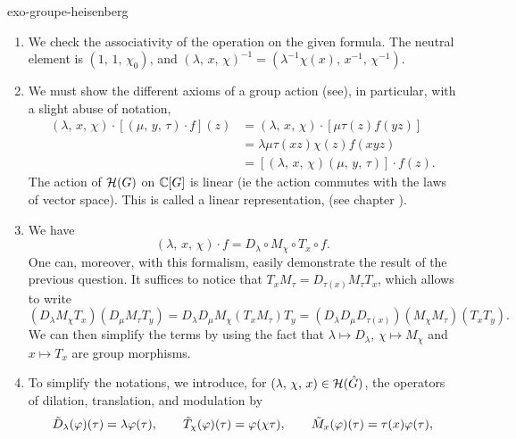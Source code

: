  
\begin{correction}{exo-groupe-heisenberg}
 \begin{enumerate}
\item We check the associativity of the operation on the given formula. The neutral element is $ (1, \, 1, \, \chi_0) $, and $ (\lambda, \, x, \, \chi)^{-1} = (\lambda^{-1} \chi (x), \, x^{-1}, \, \chi^{-1}) $.
\item We must show the different axioms of a group action (see{\upshape \cite{perrin}}), in particular, with a slight abuse of notation,
\begin{align*}
(\lambda, \, x, \, \chi) \cdot \left[(\mu, \, y, \, \tau) \cdot f \right] (z) & = (\lambda, \, x, \, \chi) \cdot \left[\mu \tau (z) f(yz) \right] \\
& = \lambda \mu \tau (xz) \chi (z) f(xyz) \\
& = \left[(\lambda, \, x, \, \chi) (\mu, \, y, \, \tau) \right] \cdot f(z).
\end{align*}
The action of $ \mathcal{H} (G) $ on $ \mathbb{C} [G] $ is linear (ie the action commutes with the laws of vector space). This is called a linear representation, (see chapter ).
\item We have
\begin{equation*}
(\lambda, \, x, \, \chi) \cdot f = D_{\lambda} \circ M_{\chi} \circ T_x \circ f.
\end{equation*}
One can, moreover, with this formalism, easily demonstrate the result of the previous question. It suffices to notice that $ T_x M_{\tau} = D_{\tau (x)} M_{\tau} T_x $, which allows to write
\begin{equation*}
(D_\lambda M_\chi T_x) (D_\mu M_\tau T_y) = D_\lambda D_\mu M_\chi (T_x M_\tau) T_y = (D_\lambda D_\mu D_{\tau (x)}) (M_\chi M_\tau) (T_x T_y).
\end{equation*}
We can then simplify the terms by using the fact that $ \lambda \mapsto D_\lambda $, $ \chi \mapsto M_\chi $ and $ x \mapsto T_x $ are group morphisms. \\
\item {} To simplify the notations, we introduce, for $ (\lambda, \, \chi, \, x) \in \mathcal{H} (\hat{G}) $, the operators of dilation, translation, and modulation by
\begin{equation*}
\wt{D}_\lambda (\varphi) (\tau) = \lambda \varphi (\tau), \quad \quad \wt{T}_\chi (\varphi) (\tau) = \varphi ( \chi \tau), \quad \quad \wt{M}_x(\varphi) (\tau) = \tau (x) \varphi (\tau),

\end{equation*}
\end{enumerate}
\end{correction}
